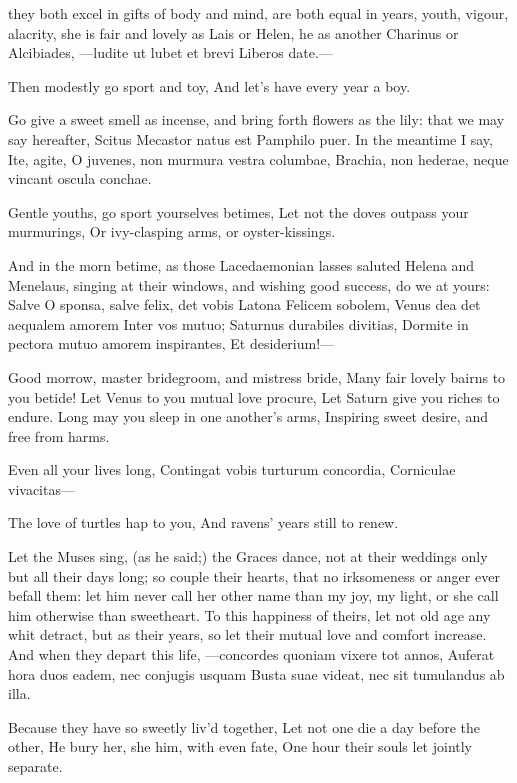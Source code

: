 {they both excel in gifts of body and mind, are both equal in years,
youth, vigour, alacrity, she is fair and lovely as Lais or Helen, he as
another Charinus or Alcibiades,
---ludite ut lubet et brevi
Liberos date.---

Then modestly go sport and toy,
And let's have every year a boy.

Go give a sweet smell as incense, and bring forth flowers as the
lily: that we may say hereafter, Scitus Mecastor natus est Pamphilo
puer. In the meantime I say,
Ite, agite, O juvenes, non murmura vestra columbae,
Brachia, non hederae, neque vincant oscula conchae.

Gentle youths, go sport yourselves betimes,
Let not the doves outpass your murmurings,
Or ivy-clasping arms, or oyster-kissings.

And in the morn betime, as those Lacedaemonian lasses saluted
Helena and Menelaus, singing at their windows, and wishing good
success, do we at yours:
Salve O sponsa, salve felix, det vobis Latona
Felicem sobolem, Venus dea det aequalem amorem
Inter vos mutuo; Saturnus durabiles divitias,
Dormite in pectora mutuo amorem inspirantes,
Et desiderium!---

Good morrow, master bridegroom, and mistress bride,
Many fair lovely bairns to you betide!
Let Venus to you mutual love procure,
Let Saturn give you riches to endure.
Long may you sleep in one another's arms,
Inspiring sweet desire, and free from harms.

Even all your lives long,
Contingat vobis turturum concordia,
Corniculae vivacitas---

The love of turtles hap to you,
And ravens' years still to renew.

Let the Muses sing, (as he said;) the Graces dance, not at their
weddings only but all their days long; so couple their hearts, that no
irksomeness or anger ever befall them: let him never call her other
name than my joy, my light, or she call him otherwise than sweetheart.
To this happiness of theirs, let not old age any whit detract, but as
their years, so let their mutual love and comfort increase. And when
they depart this life,
---concordes quoniam vixere tot annos,
Auferat hora duos eadem, nec conjugis usquam
Busta suae videat, nec sit tumulandus ab illa.

Because they have so sweetly liv'd together,
Let not one die a day before the other,
He bury her, she him, with even fate,
One hour their souls let jointly separate.

}
